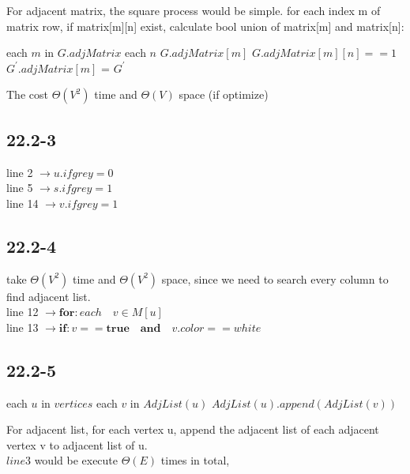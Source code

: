 \documentclass[]{article}
\begin{document}
For adjacent matrix, the square process would be simple. for each index m of matrix row, if matrix[m][n] exist, calculate bool union of matrix[m] and matrix[n]:

\begin{codebox}
	
	\li \For each $m$ in $G.adjMatrix$
	\li \Do \For each $n$ $G.adjMatrix[m]$
	\li 	\Do \If $G.adjMatrix[m][n] == 1$
	\li         \Then $G^{'}.adjMatrix[m]$ = 
	\End
	\End
	\End
	\li \Return $G^{'}$
\end{codebox}

The  cost $\Theta(V^2)$ time and $\Theta(V)$ space (if optimize)

\subsection{22.2-3}
line 2 $\rightarrow u.ifgrey = 0$\\
line 5 $\rightarrow s.ifgrey = 1$\\
line 14 $\rightarrow v.ifgrey = 1$

\subsection{22.2-4}
take $\Theta (V^2)$ time and $\Theta (V^2)$ space, since we need to search every column to find adjacent list.\\
line 12 $\rightarrow \textbf{for}: each \quad v \in M[u]$\\
line 13 $\rightarrow \textbf {if}: v == \textbf{true} \quad \textbf{and} \quad v.color == white $

\subsection{22.2-5}

\begin{codebox}
	
	\li \For each $u$ in $vertices$
	\li		\Do \For each $v$ in $AdjList(u)$
	\li 		\Do $AdjList(u).append(AdjList(v))$
	\End
	\End
\end{codebox}

For adjacent list, for each vertex u, append the adjacent list of each adjacent vertex v to adjacent list of u.\\
$line 3$ would be execute $\Theta(E)$ times in total, 
\end{document}
